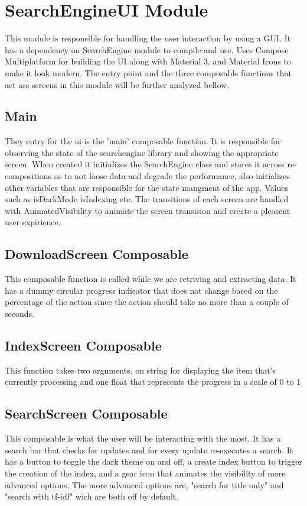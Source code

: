 \documentclass[conference]{IEEEtran}
\begin{document}
    \section{SearchEngineUI Module}{
        This module is responsible for handling the user interaction by using a GUI.
        It has a dependency on SearchEngine module to compile and use.
        Uses Compose Multiplatform for building the UI along with Material 3, and Material Icons to make it look modern.
        The entry point and the three composable functions that act ass screens in this module will be further analyzed bellow.

        \subsection{Main}{They entry for the ui is the 'main' composable function.
        It is responsible for observing the state of the searchengine library and showing the appropriate screen.
        When created it initializes the SearchEngine class and stores it across re-compositions as to not loose data and degrade the performance,
        also initializes other variables that are responsible for the state mangment of the app. Values such as isDarkMode isIndexing etc.
        The transitions of each screen are handled with AnimatedVisibility to animate the screen transision and create a pleasent user expirience.}\label{main}

        \subsection{DownloadScreen Composable}{This composable function is called while we are retriving and extracting data.
        It has a dummy circular progress indicator that does not change based on the percentage of the action since the action should take no more than a couple of seconds.}\label{download-screen}

        \subsection{IndexScreen Composable}{This function takes two arguments, on string for displaying the item that's currently processing and one float that reprecents the progress in a scale of 0 to 1}\label{index-screen}

        \subsection{SearchScreen Composable}{This composable is what the user will be interacting with the most. It has a search bar that checks for updates and for every update re-executes a search.
        It has a button to toggle the dark theme on and off, a create index button to trigger the creation of the index, and a gear icon that animates the visibility of more advanced options.
        The more advanced options are, "search for title only" and "search with tf-idf" wich are both off by default.}\label{search-screen}

    }\label{sec:searchengineui-module}
\end{document}
